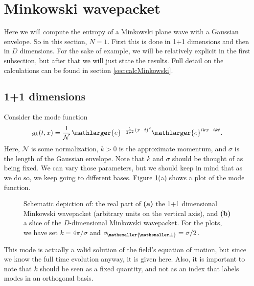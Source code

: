 \documentclass[11pt, a4paper]{article}
\newcommand{\si}{{\sigma}}
\newcommand{\mc}[1]{\mathcal{#1}}
\let\perptmp\perp
\renewcommand{\perp}{{\! \mathsmaller{\perptmp}}}
\newcommand{\e}{\mathlarger{e}}
\begin{document}
\section{Minkowski wavepacket}\label{sec:MinkowskiWavepacket}
Here we will compute the entropy of a Minkowski plane wave with a Gaussian envelope. So in this section, $N=1$. First this is done in 1+1 dimensions and then in $D$ dimensions. For the sake of example, we will be relatively explicit in the first subsection, but after that we will just state the results. Full detail on the calculations can be found in section \ref{sec:calcMinkowski}.
\subsection{1+1 dimensions}
Consider the mode function
\begin{align}
\label{eq:MinkowskiWavepacket}
g_{k}(t,x)=\frac{1}{\mc N}\,\e^{-\frac{1}{2\si^ 2}(x-t)^2}\e^{ikx-i k t}.
\end{align}
Here, $\mc N$ is some normalization, $k>0$ is the approximate momentum, and $\si$ is the length of the Gaussian envelope. Note that $k$ and $\si$ should be thought of as being fixed. We can vary those parameters, but we should keep in mind that as we do so, we keep going to different bases. Figure \ref{fig:MinkowskiWavepacket}(a) shows a plot of the mode function.

\begin{figure}[h]
\centering
\def\svgwidth{1\textwidth}
\caption{Schematic depiction of: the real part of \textbf{(a)} the 1+1 dimensional Minkowski wavepacket (arbitrary units on the vertical axis), and \textbf{(b)} a slice of the $D$-dimensional Minkowski wavepacket. For the plots, we have set $k=4\pi/\si$ and $\si_\perp=\si/2$. \label{fig:MinkowskiWavepacket}}
\end{figure}

This mode is actually a valid solution of the field's equation of motion, but since we know the full time evolution anyway, it is given here. Also, it is important to note that $k$ should be seen as a fixed quantity, and not as an index that labels modes in an orthogonal basis.
\end{document}

